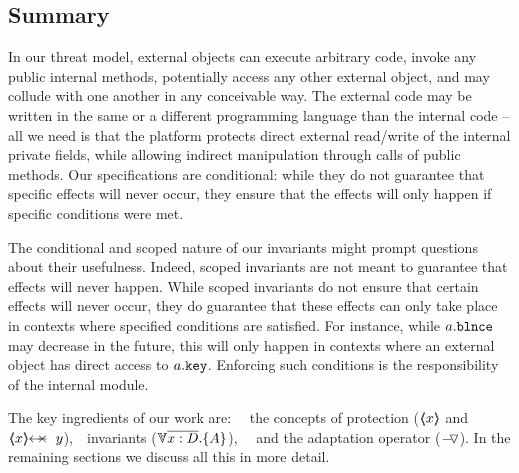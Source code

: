  
\subsection*{Summary}

In our threat model, external objects can execute arbitrary code, invoke any public internal methods,  potentially access any other external object, and may collude with one another in any conceivable way.
The external code may be written in the same or a different programming language than the internal code -- all we need is that the platform protects direct external read/write of  the internal private fields, while allowing indirect manipulation through calls of public methods.
Our specifications are conditional: while they do not guarantee that specific effects will never occur, they  ensure that the effects will only happen if specific conditions were met. %



The conditional and scoped nature of our invariants might prompt questions about their usefulness.
 Indeed, scoped invariants are not meant to guarantee that effects will never happen. 
While scoped invariants do not ensure that certain effects will never occur, they do guarantee that these effects can only take place in contexts where specified conditions are satisfied. For instance, while   $a.\mbox{\normalfont{\texttt{\mbox{\normalfont{\texttt{blnce}}}}}}$ may  decrease in the future, this will only happen in contexts where an external object has direct access to  $a.\mbox{\normalfont{\texttt{key}}}$. 
 Enforcing such conditions is the responsibility of the internal module.
 
 
The key ingredients of our work are: \ \ the concepts of protection ($\langle\!\!\langle x \rangle\!\!\rangle$ and $\protectedFrom {x} {y}$),\ \  \scoped invariants (${\TwoStatesN {\overline {x:D}} {A}}$), \ \  and  the adaptation operator ($ { } \!-\!\!\!\,\!{\triangledown} { } $).
 In the remaining sections we discuss all this in more detail.

 

 


 

 



 
 
